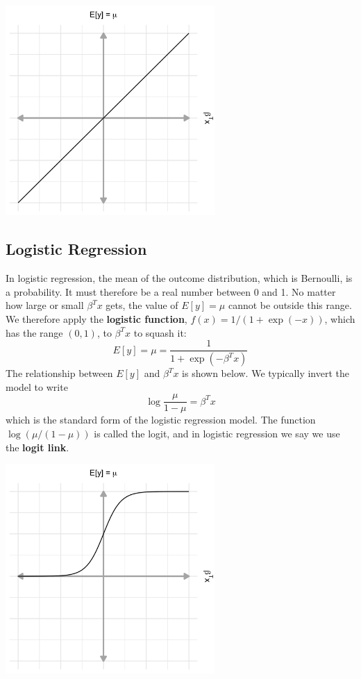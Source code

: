 \begin{center}
\includegraphics[width=0.6\textwidth]{img/l02-figure1-linreg.png}
\end{center}

\subsection{Logistic Regression}

In logistic regression, the mean of the outcome distribution, which is Bernoulli, is a probability. It must therefore be a real number between 0 and 1. No matter how large or small $\beta^T x$ gets, the value of $E[y] = \mu$ cannot be outside this range. We therefore apply the \textbf{logistic function}, $f(x) = 1/(1 + \exp(-x))$, which has the range $(0, 1)$, to $\beta^T x$ to squash it:
\begin{equation} E[y] = \mu = \frac{1}{1 + \exp{(-\beta^Tx)}} \label{eqn:meanlogistic} \end{equation}
The relationship between $E[y]$ and $\beta^T x$ is shown below. We typically invert the model to write
$$ \log{\frac{\mu}{1-\mu}} = \beta^T x $$
which is the standard form of the logistic regression model. The function $\log \left( \mu/(1-\mu) \right)$ is called the logit, and in logistic regression we say we use the \textbf{logit link}.

\begin{center}
\includegraphics[width=0.6\textwidth]{img/l02-figure2-logistic.png}
\end{center}

